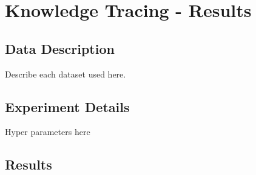 \chapter{Knowledge Tracing - Results}

\section{Data Description}
Describe each dataset used here.

\section{Experiment Details}
Hyper parameters here

\section{Results}
